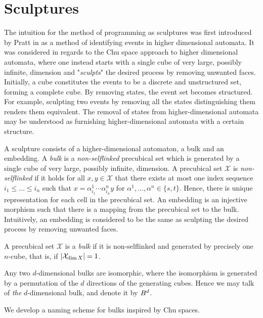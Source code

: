 \section{Sculptures}
\label{sec:sculptures}
    The intuition for the method of programming as sculptures was first introduced by Pratt in \cite{Pratt00Sculptures} as a method of identifying events in higher dimensional automata. It was considered in regards to the Chu space approach to higher dimensional automata, where one instead starts with a single cube of very large, possibly infinite, dimension and "\emph{sculpts}" the desired process by removing unwanted faces. Initially, a cube constitutes the events to be a discrete and unstructured set, forming a complete cube. By removing states, the event set becomes structured. For example, sculpting two events by removing all the states distinguishing them renders them equivalent. The removal of states from higher-dimensional automata may be understood as furnishing higher-dimensional automata with a certain structure.
    
    A sculpture consists of a higher-dimensional automaton, a bulk and an embedding. A \emph{bulk} is a \emph{non-selflinked} precubical set which is generated by a single cube of very large, possibly infinite, dimension. A precubical set $\mathcal{X}$ is \emph{non-selflinked} if it holds for all $x, y\in \mathcal{X}$ that there exists at most one index sequence $i_1\le\dotsc\le i_n$ such that $x= \alpha^1_{ i_1}\dotsm \alpha^n_{ i_n} y$ for $\alpha^1,\dotsc, \alpha^n\in\{ s, t\}$. Hence, there is unique representation for each cell in the precubical set. An embedding is an injective morphism such that there is a mapping from the precubical set to the bulk. Intuitively, an embedding is considered to be the same as sculpting the desired process by removing unwanted faces.

    \begin{definition}[Bulk]\label{def:bulk}
        A precubical set $\mathcal{X}$ is a \emph{bulk} if it is non-selflinked and generated by precisely one $n$-cube, that is, if $|  \mathcal{X}_{ \dim X}|= 1$.
    \end{definition}

    Any two $d$-dimensional bulks are isomorphic, where the isomorphism is generated by a permutation of the $d$ directions of the generating cubes.  Hence we may talk of \emph{the} $d$-dimensional bulk, and denote it by $B^{d}$.

    We develop a naming scheme for bulks inspired by Chu spaces. 

